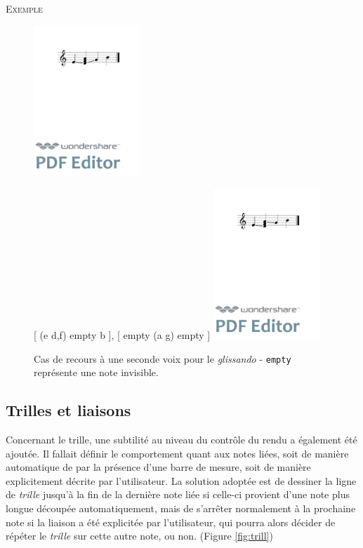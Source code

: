 \documentclass{article}
\newenvironment{gmncode}	{\vspace{-2mm}\small\verbatim}{\endverbatim\vspace{-2mm}}
\newcommand{\code}[1]		{{\small \texttt{#1}}}
\newcommand{\exemple}		{\vspace{2mm}\hspace*{-6mm}\textsc{Exemple}}
\begin{document}
\exemple
\begin{figure}[h]
\centering
\begin{gmncode}
[ \glissando(e {d,f,a} g) b ]
\end{gmncode}
\includegraphics[width=4cm]{img/glissandopb.pdf}

\begin{gmncode}
{ 
  [ \glissando(e {d,f}) empty b ],
  [  empty \glissando(a g) empty ] 
}
\end{gmncode}
\includegraphics[width=4cm]{img/glissandosanspb.pdf}
\caption{Cas de recours à une seconde voix pour le \emph{glissando} -
\code{empty} représente une note invisible.}
\label{fig:glissandopb}
\end{figure}


\subsection{Trilles et liaisons}\label{subsec:trillesLiaison}

Concernant le trille, une subtilité au niveau du contr\^ole du rendu a également été ajoutée. Il fallait définir le comportement quant aux notes liées, soit de manière automatique de par la présence d'une barre de mesure, soit de manière explicitement décrite par l'utilisateur. La solution adoptée est de dessiner la ligne de \emph{trille} jusqu'à la fin de la dernière note liée si celle-ci provient d'une note plus longue découpée automatiquement, mais de s'arrêter normalement à la prochaine note si la liaison a été explicitée par l'utilisateur, qui pourra alors décider de répéter le \emph{trille} sur cette autre note, ou non. (Figure \ref{fig:trill})
\end{document}
